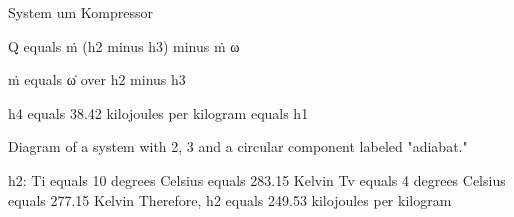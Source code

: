 System um Kompressor

Q equals ṁ (h2 minus h3) minus ṁ ω

ṁ equals ω̇ over h2 minus h3

h4 equals 38.42 kilojoules per kilogram equals h1

Diagram of a system with 2, 3 and a circular component labeled "adiabat."

h2: Ti equals 10 degrees Celsius equals 283.15 Kelvin
Tv equals 4 degrees Celsius equals 277.15 Kelvin
Therefore, h2 equals 249.53 kilojoules per kilogram